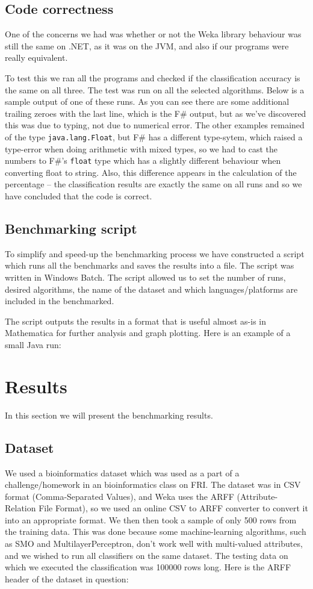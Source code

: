 \documentclass[journal]{IEEEtran/IEEEtran}
\newcommand\ver[1]{%
{\texttt{#1}}}
\newcommand\subsect[1]{\subsection{#1}\noindent}
\begin{document}
\subsect{Code correctness}One of the concerns we had was whether or not the Weka library behaviour was still the same on .NET, as it was on the JVM, and also if our programs were really equivalent.

To test this we ran all the programs and checked if the classification accuracy is the same on all three. The test was run on all the selected algorithms. Below is a sample output of one of these runs. As you can see there are some additional trailing zeroes with the last line, which is the F\# output, but as we've discovered this was due to typing, not due to numerical error. The other examples remained of the type \ver{java.lang.Float}, but F\# has a different type-sytem, which raised a type-error when doing arithmetic with mixed types, so we had to cast the numbers to F\#'s \ver{float} type which has a slightly different behaviour when converting float to string. Also, this difference appears in the calculation of the percentage -- the classification results are exactly the same on all runs and so we have concluded that the code is correct.


\subsect{Benchmarking script}To simplify and speed-up the benchmarking process we have constructed a script which runs all the benchmarks and saves the results into a file. The script was written in Windows Batch. The script allowed us to set the number of runs, desired algorithms, the name of the dataset and which languages/platforms are included in the benchmarked.


The script outputs the results in a format that is useful almost as-is in Mathematica for further analysis and graph plotting. Here is an example of a small Java run:



\section{Results}
In this section we will present the benchmarking results.
\subsect{Dataset}We used a bioinformatics dataset which was used as a part of a challenge/homework in an bioinformatics class on FRI\cite{citation needed}. The dataset was in CSV format (Comma-Separated Values), and Weka uses the ARFF (Attribute-Relation File Format), so we used an online CSV to ARFF converter to convert it into an appropriate format. We then then took a sample of only 500 rows from the training data. This was done because some machine-learning algorithms, such as SMO and MultilayerPerceptron, don't work well with multi-valued attributes, and we wished to run all classifiers on the same dataset. The testing data on which we executed the classification was 100000 rows long. Here is the ARFF header of the dataset in question:

\end{document}
